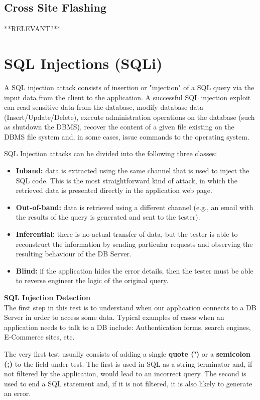 	\subsection{Cross Site Flashing}
	**RELEVANT?**

\section{SQL Injections (SQLi)}
	A SQL injection attack consists of insertion or "injection" of a SQL query via the input data 
	from the client to the application. A successful SQL injection exploit can read sensitive data 
	from the database, modify database data (Insert/Update/Delete), execute administration operations 
	on the database (such as shutdown the DBMS), recover the content of a given file existing on 
	the DBMS file system and, in some cases, issue commands to the operating system. 

	SQL Injection attacks can be divided into the following three classes:
		\begin{itemize}
			\item {\bf Inband:} data is extracted using the same channel that is used to inject the 
			SQL code. This is the most straightforward kind of attack, in which the retrieved data 
			is presented directly in the application web page.
			\item {\bf Out-of-band:} data is retrieved using a different channel (e.g., an email with the 
			results of the query is generated and sent to the tester).
			\item {\bf Inferential:} there is no actual transfer of data, but the tester is able to
			reconstruct the information by sending particular requests and observing the resulting 
			behaviour of the DB Server.
			\item {\bf Blind: } if the application hides the error details, then the tester must be 
			able to reverse engineer the logic of the original query.
		\end{itemize}

	{\bf SQL Injection Detection} \\
	The first step in this test is to understand when our application connects to a DB Server in order 
	to access some data. Typical examples of cases when an application needs to talk to a DB include:
	Authentication forms, search engines, E-Commerce sites, etc.

	The very first test usually consists of adding a single {\bf quote (')} or a {\bf semicolon (;)} 
	to the field  under test. The first is used in SQL as a string terminator and, if not filtered by 
	the application, would lead to an incorrect query. The second is used to end a SQL statement and, 
	if it is not filtered, it is also likely to generate an error. 

